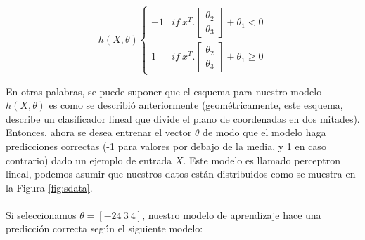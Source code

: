     \begin{equation}
        h(X,\theta)\begin{cases}-1 & if\ x^T.\begin{bmatrix}\theta_2\\\theta_3 \end{bmatrix}+\theta_1< 0\\1 & if\ x^T.\begin{bmatrix}\theta_2\\\theta_3 \end{bmatrix}+\theta_1 \geq 0\end{cases}
    \end{equation}

    En otras palabras, se puede suponer que el esquema para nuestro modelo $h(X,\theta)$ es como se describió anteriormente (geométricamente, este esquema, describe un clasificador lineal que divide el plano de coordenadas en dos mitades). Entonces, ahora se desea entrenar el vector $\theta$ de modo que el modelo haga predicciones correctas (-1 para valores por debajo de la media, y 1 en caso contrario) dado un ejemplo de entrada $X$. Este modelo es llamado perceptron lineal, podemos asumir que nuestros datos están distribuidos como se muestra en la Figura \ref{fig:sdata}.
    \\\\
    Si seleccionamos $\theta=[-24\ 3\ 4]$, nuestro modelo de aprendizaje hace una predicción correcta según el siguiente modelo:

